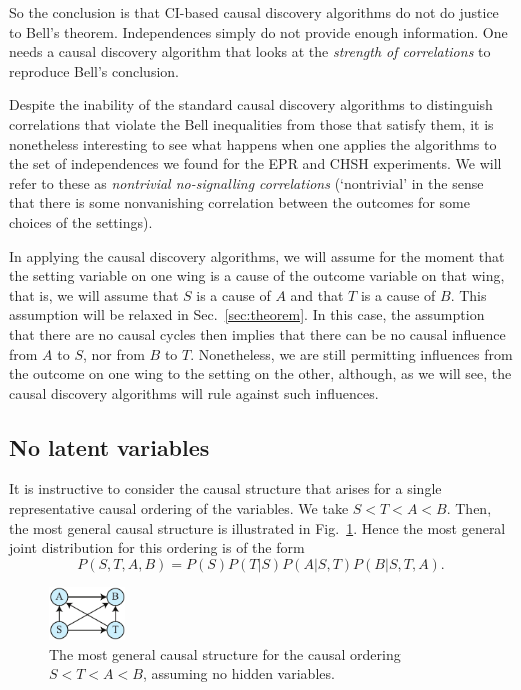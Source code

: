 \documentclass[12pt,onecolumn,nofootinbib]{revtex4-2}
\begin{document}
So the conclusion is that CI-based causal discovery algorithms do not  do justice to Bell's theorem.
Independences simply do not provide enough information. One needs a causal
discovery algorithm that looks at the {\em strength of correlations} to reproduce Bell's conclusion.

Despite the inability of the standard causal discovery algorithms to
distinguish correlations that violate the Bell inequalities from those that
satisfy them, it is nonetheless interesting to see what happens when one
applies the algorithms to the set of independences we found for the EPR and
CHSH experiments. We will refer to these as \emph{nontrivial no-signalling
correlations} (`nontrivial' in the sense that there is some nonvanishing correlation between the outcomes
for some choices of the settings).

In applying the causal discovery algorithms, we will assume for the moment that the setting variable on one wing is a cause of the outcome variable on that wing, that is, we will assume that $S$ is a cause of $A$ and that $T$ is a cause of $B$.  This assumption will be relaxed in Sec.~\ref{sec:theorem}.
In this case, the assumption that there are no causal cycles then implies that there can be no causal influence from $A$ to $S$, nor from $B$ to $T$. Nonetheless, we are still permitting influences from the outcome on one wing to the setting on the other, although, as we will see, the causal discovery algorithms will rule against such influences.


\subsection{No latent variables}
\label{sec:qcor-nohvar}

It is instructive to consider the causal structure that arises for a single representative
causal ordering of the variables. We take $S<T<A<B.$ Then, the most general
causal structure is illustrated in Fig.~\ref{fig:bell-gen}. Hence the most general joint
distribution for this ordering is of the form
\begin{equation*}
P(S,T,A,B)=P(S)P(T|S)P(A|S,T)P(B|S,T,A).
\end{equation*}%

\begin{figure}[h]
	\centering
	\includegraphics[width=0.18\textwidth]{bell-gen}
 \caption{The most general causal structure for the causal ordering $S<T<A<B$, assuming no hidden variables.}
       \label{fig:bell-gen}
\end{figure}
\end{document}
